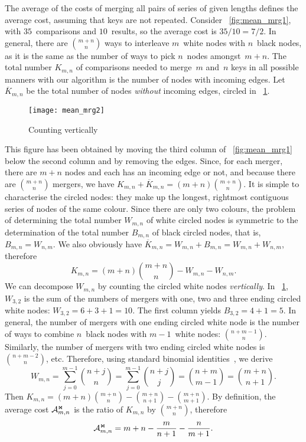 The average of the costs of merging all pairs of series of given
lengths defines the average cost, assuming that keys are not
repeated. Consider \fig~\ref{fig:mean_mrg1}, with \(35\)~comparisons
and \(10\)~results, so the average cost is \(35/10 = 7/2\). In
general, there are \(\binom{m+n}{n}\) ways to interleave \(m\)~white
nodes with \(n\)~black nodes, as it is the same as the number of ways
to pick \(n\)~nodes amongst~\(m+n\). The total number \(K_{m,n}\) of
comparisons needed to merge~\(m\) and~\(n\) keys in all possible
manners with our algorithm is the number of nodes with incoming
edges. Let \(\overline{K}_{m,n}\) be the total number of nodes
\emph{without} incoming edges, circled in \fig~\ref{fig:mean_mrg2}.
\begin{figure}[b]
\centering
\texttt{[image: mean\_mrg2]}
\caption{Counting vertically\label{fig:mean_mrg2}}
\end{figure}
This figure has been obtained by moving the third column of
\fig~\ref{fig:mean_mrg1} below the second column and by removing the
edges. Since, for each merger, there are \(m+n\) nodes and each has an
incoming edge or not, and because there are \(\binom{m+n}{n}\)
mergers, we have \(K_{m,n} + \overline{K}_{m,n} = (m + n)
\binom{m+n}{n}\). It is simple to characterise the circled nodes: they
make up the longest, rightmost contiguous series of nodes of the same
colour. Since there are only two colours, the problem of determining
the total number \(W_{m,n}\) of white circled nodes is symmetric to
the determination of the total number \(B_{m,n}\) of black circled
nodes, that is, \(B_{m,n} = W_{n,m}\). We also obviously have
\(\overline{K}_{m,n} = W_{m,n} + B_{m,n} = W_{m,n} + W_{n,m}\),
therefore
\begin{equation*}
K_{m,n} = (m + n) \binom{m+n}{n} - W_{m,n} - W_{n,m}.
\end{equation*}
We can decompose \(W_{m,n}\) by counting the circled white nodes
\emph{vertically}. In \fig~\ref{fig:mean_mrg2}, \(W_{3,2}\) is the sum
of the numbers of mergers with one, two and three ending circled
white nodes: \(W_{3,2} = 6 + 3 + 1 = 10\). The first column yields
\(B_{3,2} = 4 + 1 = 5\). In general, the number of mergers with one
ending circled white node is the number of ways to combine \(n\)~black
nodes with \(m-1\)~white nodes: \(\binom{n+m-1}{n}\). Similarly, the
number of mergers with two ending circled white nodes is
\(\binom{n+m-2}{n}\), etc. Therefore, using standard binomial
identities~\cite{GrahamKnuthPatashnik:1994}, we derive
\begin{equation*}
  W_{m,n} = \sum_{j=0}^{m-1}{\binom{n+j}{n}}
       = \sum_{j=0}^{m-1}{\binom{n+j}{j}}
       = \binom{n+m}{m-1}
       = \binom{m+n}{n+1}.
\end{equation*}
Then \(K_{m,n} = (m + n) \binom{m+n}{n} - \binom{m+n}{n+1} -
\binom{m+n}{m+1}\). By definition, the average cost \(\mathcal{A}_{m,n}^{\Join}\)
is the ratio of \(K_{m,n}\) by \(\binom{m+n}{n}\), therefore
\begin{equation}
\mathcal{A}_{m,n}^{\Join} = m + n - \frac{m}{n+1} - \frac{n}{m+1}.
\label{eq:mean_merge}
\end{equation}
